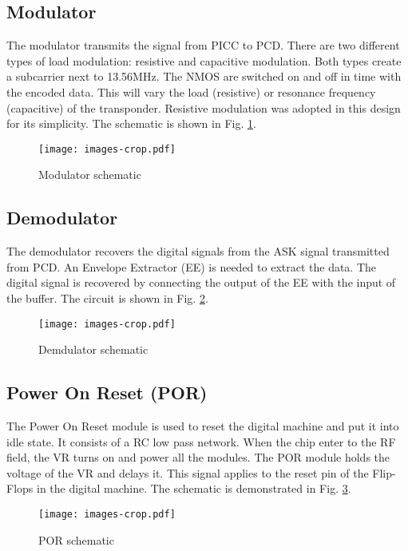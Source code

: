 \subsection{Modulator}

The modulator \cite{rfid_modulador} transmits the signal from PICC to PCD. There are two different types of load modulation: resistive and capacitive modulation. Both types create a subcarrier next to 13.56MHz. The NMOS are switched on and off in time with the encoded data. This will vary the load (resistive) or resonance frequency  (capacitive) of the transponder.  Resistive modulation was adopted in this design for its simplicity. The schematic is shown in Fig. \ref{fig:mod}.

\begin{figure}[h]
  \centering
  \texttt{[image: images-crop.pdf]}
  \caption{Modulator schematic}
  \label{fig:mod}
\end{figure}

\subsection{Demodulator}

The demodulator recovers the digital signals from the ASK signal transmitted from PCD. An Envelope Extractor (EE) \cite{rfid_demodulador} is needed to extract the data. The digital signal is recovered by connecting the output of the EE with the input of the buffer. The circuit is shown in Fig. \ref{fig:demod}. 

\begin{figure}[h]
  \centering
  \texttt{[image: images-crop.pdf]}
  \caption{Demdulator schematic}
  \label{fig:demod}
\end{figure}

\subsection{Power On Reset (POR)}

The Power On Reset module is used to reset the digital machine and put it into idle state. It consists of a RC low pass network. When the chip enter to the RF field, the VR turns on and power all the modules. The POR module holds the voltage of the VR and delays it. This signal applies to the reset pin of the Flip-Flops in the digital machine. The schematic is demonstrated in Fig. \ref{fig:por}. 

\begin{figure}[h]
  \centering
  \texttt{[image: images-crop.pdf]}
  \caption{POR schematic}
  \label{fig:por}
\end{figure}
